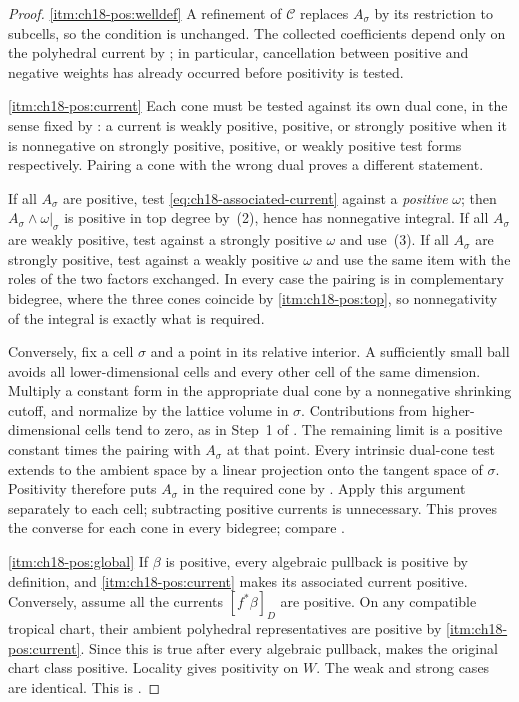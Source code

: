 \begin{proof}
\cref{itm:ch18-pos:welldef} A refinement of $\mathscr C$ replaces
$A_\sigma$ by its restriction to subcells, so the condition is unchanged.
The collected coefficients depend only on the polyhedral current by
; in particular, cancellation between
positive and negative weights has already occurred before positivity is
tested.

\cref{itm:ch18-pos:current} Each cone must be tested against its own dual
cone, in the sense fixed by : a current is
weakly positive, positive, or strongly positive when it is nonnegative on
strongly positive, positive, or weakly positive test forms respectively.
Pairing a cone with the wrong dual proves a different statement.

If all $A_\sigma$ are positive, test
\eqref{eq:ch18-associated-current} against a \emph{positive} $\omega$; then
$A_\sigma\wedge\omega|_\sigma$ is positive in top degree by
\,(2), hence has nonnegative integral.
If all $A_\sigma$ are weakly positive, test against a strongly positive
$\omega$ and use \,(3).  If all
$A_\sigma$ are strongly positive, test against a weakly positive $\omega$
and use the same item with the roles of the two factors exchanged.  In
every case the pairing is in complementary bidegree, where the three cones
coincide by \cref{itm:ch18-pos:top}, so nonnegativity of the integral is
exactly what is required.

Conversely, fix a cell $\sigma$ and a point in its relative interior.  A
sufficiently small ball avoids all lower-dimensional cells and every other
cell of the same dimension.  Multiply a constant form in the appropriate
dual cone by a nonnegative shrinking cutoff, and normalize by the lattice
volume in $\sigma$.  Contributions from higher-dimensional cells tend to
zero, as in Step~1 of .  The remaining
limit is a positive constant times the pairing with $A_\sigma$ at that
point.  Every intrinsic dual-cone test extends to the ambient space by a
linear projection onto the tangent space of $\sigma$.  Positivity therefore
puts $A_\sigma$ in the required cone by
.  Apply this argument separately to
each cell; subtracting positive currents is unnecessary.  This proves the
converse for each cone in every bidegree; compare
\cite[Remark~1.11]{GK19}.

\cref{itm:ch18-pos:global} If $\beta$ is positive, every algebraic pullback
is positive by definition, and \cref{itm:ch18-pos:current} makes its
associated current positive.  Conversely, assume all the currents
$[f^*\beta]_D$ are positive.  On any compatible tropical chart, their
ambient polyhedral representatives are positive by
\cref{itm:ch18-pos:current}.  Since this is true after every algebraic
pullback,  makes the original chart class
positive.  Locality gives positivity on $W$.  The weak and strong cases are
identical.  This is \cite[Proposition~2.13]{GK19}.


\end{proof}
